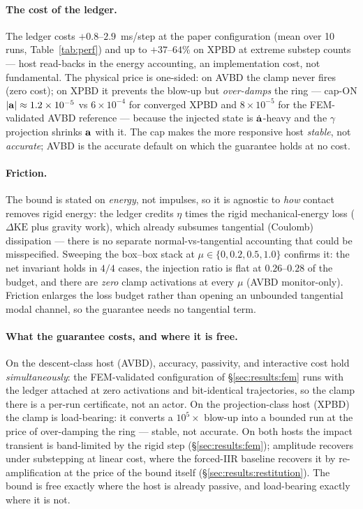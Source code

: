\paragraph*{The cost of the ledger.} The ledger costs $+0.8$--$2.9$~ms/step at
the paper configuration (mean over 10 runs, Table~\ref{tab:perf}) and up to
$+37$--$64\%$ on XPBD at extreme substep counts
--- host read-backs in the energy accounting, an implementation cost, not
fundamental. The physical price is one-sided: on AVBD the clamp never fires
(zero cost); on XPBD it prevents the blow-up but \emph{over-damps} the ring
--- cap-ON $|\mathbf{a}|\approx1.2\times10^{-5}$ vs $6\times10^{-4}$ for converged
XPBD and $8\times10^{-5}$ for the FEM-validated AVBD reference --- because
the injected state is $\dot{\mathbf{a}}$-heavy and the $\gamma$ projection shrinks
$\mathbf{a}$ with it. The cap makes the more responsive host \emph{stable}, not
\emph{accurate}; AVBD is the accurate default on which the guarantee holds at no cost.

\paragraph*{Friction.} The bound is stated on \emph{energy}, not impulses, so
it is agnostic to \emph{how} contact removes rigid energy: the ledger credits
$\eta$ times the rigid mechanical-energy loss ($\Delta\mathrm{KE}$ plus gravity
work), which already subsumes tangential (Coulomb) dissipation --- there is no
separate normal-vs-tangential accounting that could be misspecified. Sweeping the box--box
stack at $\mu\in\{0,0.2,0.5,1.0\}$ confirms it: the net invariant holds in
$4/4$ cases, the injection ratio is flat at $0.26$--$0.28$ of the budget, and
there are \emph{zero} clamp activations at every $\mu$ (AVBD monitor-only).
Friction enlarges the loss budget rather than opening an unbounded tangential
modal channel, so the guarantee needs no tangential term.

\paragraph*{What the guarantee costs, and where it is free.}
On the
descent-class host (AVBD), accuracy, passivity, and interactive cost hold
\emph{simultaneously}: the FEM-validated configuration of
\S\ref{sec:results:fem} runs with the ledger attached at zero activations and
bit-identical trajectories, so the clamp there is a per-run certificate, not
an actor. On the projection-class host (XPBD) the clamp is load-bearing: it
converts a $10^{5}\times$ blow-up into a bounded run at the price of
over-damping the ring --- stable, not accurate. On both hosts the impact
transient is band-limited by the rigid step (\S\ref{sec:results:fem});
amplitude recovers under substepping at linear cost, where the forced-IIR
baseline recovers it by re-amplification at the price of the bound itself
(\S\ref{sec:results:restitution}). The bound is free exactly where the host
is already passive, and load-bearing exactly where it is not.

